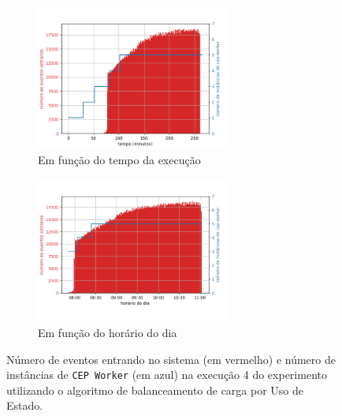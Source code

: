 \begin{figure}[h]
\centering
\begin{subfigure}{\textwidth}
\centering
\includegraphics[width=0.7\textwidth]{figuras/graphics/carga_e_workers_total9-dez-su.png}
\caption{Em função do tempo da execução}
\label{fig:workers_and_load_total_9-dez-su}
\end{subfigure}%

\begin{subfigure}{\textwidth}
\centering
\includegraphics[width=0.7\textwidth]{figuras/graphics/carga_e_workers_horario9-dez-su.png}
\caption{Em função do horário do dia}
\label{fig:workers_and_load_SPtrans_9-dez-su}
\end{subfigure}%
\caption{Número de eventos entrando no sistema (em vermelho) e número de instâncias de \texttt{CEP Worker} (em azul) na execução 4 do experimento utilizando o algoritmo de balanceamento de carga por Uso de Estado.}
\end{figure}



